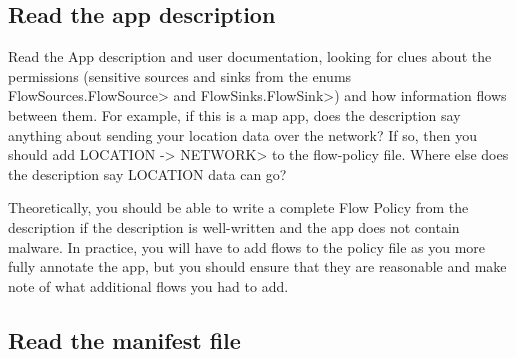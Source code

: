 \subsection{Read the app description}
\label{sec:read-the-app-description}

Read the App description and user documentation, looking for clues about
the permissions (sensitive sources and sinks from the enums
\<FlowSources.FlowSource> and \<FlowSinks.FlowSink>) and how information
flows between them.  For example,
if this is a map app, does the description say anything about sending your location data over the
 network?  If so, then you should add \<LOCATION -> NETWORK> to the flow-policy file.  Where
else does the description say LOCATION data can go?   

Theoretically, you should be able to write a complete Flow Policy from the
description if the description is well-written and the app does not contain
malware.  In practice, you will have to add flows to the policy file as you
more fully annotate the app, but you should ensure that they are reasonable
and make note of what additional flows you had to add.
 

\subsection{Read the manifest file}

